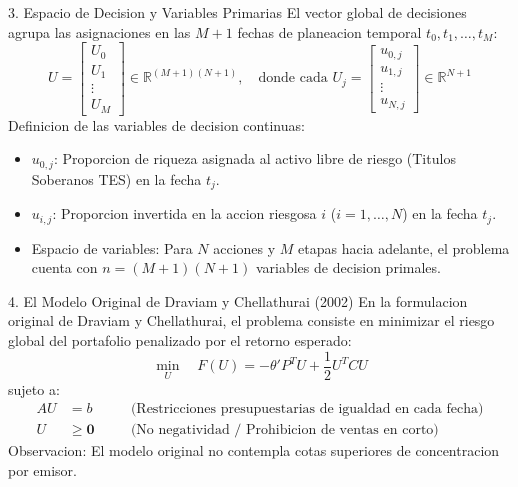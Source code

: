 \documentclass[aspectratio=169,10pt]{beamer}
\begin{document}
\begin{frame}{3. Espacio de Decision y Variables Primarias}
  El vector global de decisiones agrupa las asignaciones en las $M+1$ fechas de planeacion temporal $t_0, t_1, \dots, t_M$:
  \vspace{0.2cm}
  \begin{equation*}
    U = \begin{bmatrix} U_0 \\ U_1 \\ \vdots \\ U_M \end{bmatrix} \in \mathbb{R}^{(M+1)(N+1)}, \quad \text{donde cada } U_j = \begin{bmatrix} u_{0,j} \\ u_{1,j} \\ \vdots \\ u_{N,j} \end{bmatrix} \in \mathbb{R}^{N+1}
  \end{equation*}
  \vspace{0.2cm}
  Definicion de las variables de decision continuas:
  \begin{itemize}
    \item $u_{0,j}$: Proporcion de riqueza asignada al activo libre de riesgo (Titulos Soberanos TES) en la fecha $t_j$.
    \vspace{0.1cm}
    \item $u_{i,j}$: Proporcion invertida en la accion riesgosa $i$ ($i = 1, \dots, N$) en la fecha $t_j$.
    \vspace{0.1cm}
    \item Espacio de variables: Para $N$ acciones y $M$ etapas hacia adelante, el problema cuenta con $n = (M+1)(N+1)$ variables de decision primales.
  \end{itemize}
\end{frame}

\begin{frame}{4. El Modelo Original de Draviam y Chellathurai (2002)}
  En la formulacion original de Draviam y Chellathurai, el problema consiste en minimizar el riesgo global del portafolio penalizado por el retorno esperado:
  \vspace{0.3cm}
  \begin{equation*}
    \min_{U} \quad F(U) = -\theta' P^T U + \frac{1}{2} U^T C U
  \end{equation*}
  \vspace{0.2cm}
  sujeto a:
  \vspace{0.2cm}
  \begin{align*}
    A U &= b \quad &&\text{(Restricciones presupuestarias de igualdad en cada fecha)} \\
    U &\ge \mathbf{0} \quad &&\text{(No negatividad / Prohibicion de ventas en corto)}
  \end{align*}
  \vspace{0.2cm}
  Observacion: El modelo original no contempla cotas superiores de concentracion por emisor.
\end{frame}
\end{document}
